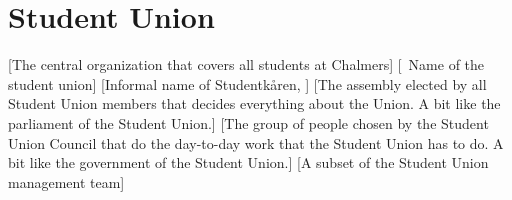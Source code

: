 \documentclass[a4paper]{article}
\begin{document}
\section{Student Union}
\begin{description}
    [The central organization that covers all students at Chalmers]
    [\formal~Name of the student union]
    [Informal name of Studentkåren, ]
    [The assembly elected by all Student Union members that decides everything about the Union. A bit like the parliament of the Student Union.]
    [The group of people chosen by the Student Union Council that do the day-to-day work that the Student Union has to do. A bit like the government of the Student Union.]
    [A subset of the Student Union management team]
\end{description}
\end{document}
